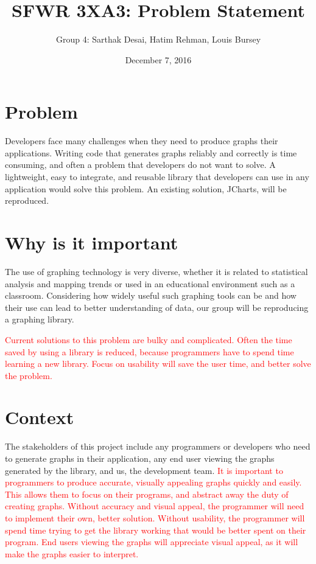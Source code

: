 \documentclass[11pt]{article} %
\title{SFWR 3XA3: Problem Statement}
\author{Group 4: Sarthak Desai, Hatim Rehman, Louis Bursey}
\date{December 7, 2016} %
\begin{document}
\maketitle

\section*{Problem}

Developers face many challenges when they need to produce graphs their applications. Writing code that generates graphs reliably and correctly is time consuming, and often a problem that developers do not want to solve. A lightweight, easy to integrate, and reusable library that developers can use in any application would solve this problem. An existing solution, JCharts, will be reproduced.



\section*{Why is it important}

The use of graphing technology is very diverse, whether it is related to statistical analysis and mapping trends or used in an educational environment such as a classroom. Considering how widely useful such graphing tools can be and how their use can lead to better understanding of data, our group will be reproducing a graphing library.

\textcolor{red}{Current solutions to this problem are bulky and complicated. Often the time saved by using a library is reduced, because programmers have to spend time learning a new library. Focus on usability will save the user time, and better solve the problem.}

\section*{Context}

The stakeholders of this project include any programmers or developers who need to generate graphs in their application, any end user viewing the graphs generated by the library, and us, the development team. \textcolor{red}{It is important to programmers to produce accurate, visually appealing graphs quickly and easily. This allows them to focus on their programs, and abstract away the duty of creating graphs. Without accuracy and visual appeal, the programmer will need to implement their own, better solution. Without usability, the programmer will spend time trying to get the library working that would be better spent on their program. End users viewing the graphs will appreciate visual appeal, as it will make the graphs easier to interpret.}
\end{document}
